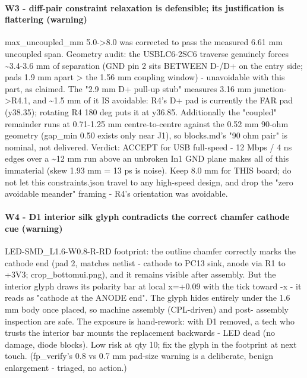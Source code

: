 \documentclass[11pt,a4paper]{article}
\begin{document}
\paragraph*{W3 - diff-pair constraint relaxation is defensible; its justification is flattering (warning)}
max\_uncoupled\_mm 5.0-\textgreater{}8.0 was corrected to pass the measured 6.61 mm uncoupled span. Geometry audit: the USBLC6-2SC6 traverse genuinely forces \textasciitilde{}3.4-3.6 mm of separation (GND pin 2 sits BETWEEN D-/D+ on the entry side; pads 1.9 mm apart \textgreater{} the 1.56 mm coupling window) - unavoidable with this part, as claimed. The "2.9 mm D+ pull-up stub" measures 3.16 mm junction-\textgreater{}R4.1, and \textasciitilde{}1.5 mm of it IS avoidable: R4's D+ pad is currently the FAR pad (y38.35); rotating R4 180 deg puts it at y36.85. Additionally the "coupled" remainder runs at 0.71-1.25 mm centre-to-centre against the 0.52 mm 90-ohm geometry (gap\_min 0.50 exists only near J1), so blocks.md's "90 ohm pair" is nominal, not delivered. Verdict: ACCEPT for USB full-speed - 12 Mbps / 4 ns edges over a \textasciitilde{}12 mm run above an unbroken In1 GND plane makes all of this immaterial (skew 1.93 mm = 13 ps is noise). Keep 8.0 mm for THIS board; do not let this constraints.json travel to any high-speed design, and drop the "zero avoidable meander" framing - R4's orientation was avoidable.

\paragraph*{W4 - D1 interior silk glyph contradicts the correct chamfer cathode cue (warning)}
LED-SMD\_L1.6-W0.8-R-RD footprint: the outline chamfer correctly marks the cathode end (pad 2, matches netlist - cathode to PC13 sink, anode via R1 to +3V3; crop\_bottomui.png), and it remains visible after assembly. But the interior glyph draws its polarity bar at local x=+0.09 with the tick toward -x - it reads as "cathode at the ANODE end". The glyph hides entirely under the 1.6 mm body once placed, so machine assembly (CPL-driven) and post- assembly inspection are safe. The exposure is hand-rework: with D1 removed, a tech who trusts the interior bar mounts the replacement backwards - LED dead (no damage, diode blocks). Low risk at qty 10; fix the glyph in the footprint at next touch. (fp\_verify's 0.8 vs 0.7 mm pad-size warning is a deliberate, benign enlargement - triaged, no action.)
\end{document}
